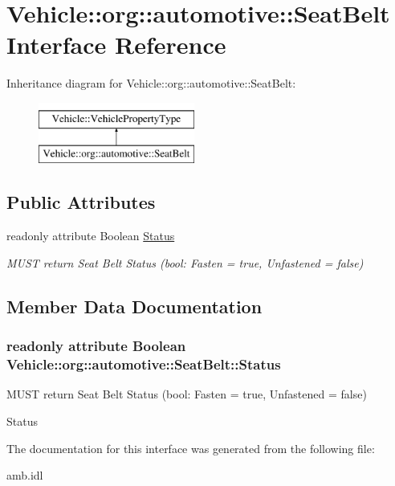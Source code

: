 \hypertarget{interfaceVehicle_1_1org_1_1automotive_1_1SeatBelt}{\section{Vehicle\-:\-:org\-:\-:automotive\-:\-:Seat\-Belt Interface Reference}
\label{interfaceVehicle_1_1org_1_1automotive_1_1SeatBelt}
}
Inheritance diagram for Vehicle\-:\-:org\-:\-:automotive\-:\-:Seat\-Belt\-:\begin{figure}[H]
\begin{center}
\leavevmode
\includegraphics[height=2.000000cm]{interfaceVehicle_1_1org_1_1automotive_1_1SeatBelt}
\end{center}
\end{figure}
\subsection*{Public Attributes}
\begin{DoxyCompactItemize}
\item 
readonly attribute Boolean \hyperlink{interfaceVehicle_1_1org_1_1automotive_1_1SeatBelt_a037bffab5204a34f05a6efb9a2a3b5d1}{Status}
\begin{DoxyCompactList}\small\item\em M\-U\-S\-T return Seat Belt Status (bool\-: Fasten = true, Unfastened = false) \end{DoxyCompactList}\end{DoxyCompactItemize}


\subsection{Member Data Documentation}
\hypertarget{interfaceVehicle_1_1org_1_1automotive_1_1SeatBelt_a037bffab5204a34f05a6efb9a2a3b5d1}{
\subsubsection[{Status}]{\setlength{\rightskip}{0pt plus 5cm}readonly attribute Boolean Vehicle\-::org\-::automotive\-::\-Seat\-Belt\-::\-Status}}\label{interfaceVehicle_1_1org_1_1automotive_1_1SeatBelt_a037bffab5204a34f05a6efb9a2a3b5d1}


M\-U\-S\-T return Seat Belt Status (bool\-: Fasten = true, Unfastened = false) 

Status 

The documentation for this interface was generated from the following file\-:\begin{DoxyCompactItemize}
\item 
amb.\-idl\end{DoxyCompactItemize}
